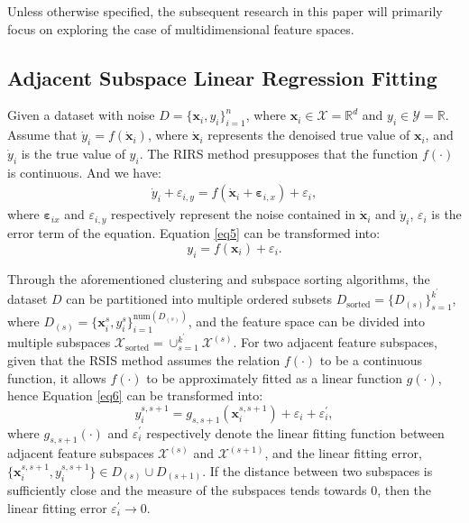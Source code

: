 \documentclass[final,3p,times]{elsarticle}
\begin{document}
Unless otherwise specified, the subsequent research in this paper 
will primarily focus on exploring the case of multidimensional 
feature spaces.

\subsection{Adjacent Subspace Linear Regression Fitting}
Given a dataset with noise $D=\{\boldsymbol{x}_i,y_i\}_{i=1}^n$, 
where $\boldsymbol{x}_i\in \mathcal{X}=\mathbb{R}^d$ and 
$y_i\in\mathcal{Y}=\mathbb{R}$. Assume that 
$\dot{y}_i=f(\dot{\boldsymbol{x}}_i)$, where 
$\dot{\boldsymbol{x}}_i$ represents the denoised true value of 
$\boldsymbol{x}_i$, and $\dot{y}_i$ is the true value of 
$y_i$. The RIRS method presupposes that the function $f(\cdot)$ 
is continuous. And we have:
\begin{align} 
\label{eq5}
\dot{y}_i+\varepsilon_{i,y}=f(\dot{\boldsymbol{x}}_i+
\boldsymbol{\varepsilon}_{i,x})+\varepsilon_i, 
\end{align}
where $\boldsymbol{\varepsilon}_{ix}$ and $\varepsilon_{i,y}$ 
respectively represent the noise contained in 
$\dot{\boldsymbol{x}}_i$ and $\dot{y}_i$, $\varepsilon_i$ is the 
error term of the equation. Equation \eqref{eq5} can be transformed into:
\begin{equation} 
\label{eq6}
y_i=f(\boldsymbol{x}_i)+\varepsilon_i. 
\end{equation}

Through the aforementioned clustering and subspace sorting 
algorithms, the dataset $D$ can be partitioned into multiple 
ordered subsets $D_{\text{sorted}}=\{D_{(s)}\}_{s=1}^{k^\prime}$, 
where $D_{(s)}=\{ \boldsymbol{x}_i^s,y_i^s \}_{i=1}^{\text{num}
(D_{(s)})}$, and the feature space can be divided into multiple 
subspaces $\mathcal{X}_{\text{sorted}}=\cup_{s=1}^{k^\prime}\mathcal{X}^{(s)}$. For 
two adjacent feature subspaces, given that the RSIS method assumes 
the relation $f(\cdot)$ to be a continuous function, it allows 
$f(\cdot)$ to be approximately fitted as a linear function 
$g(\cdot)$, hence Equation \eqref{eq6} can be transformed into: 
\begin{equation} 
\label{eq7}
y_i^{s,s+1}=g_{s,s+1}(\boldsymbol{x}_i^{s,s+1})+\varepsilon_i+
\varepsilon_i^\prime, 
\end{equation}
where $g_{s,s+1}(\cdot)$ and $\varepsilon_i^\prime$ respectively 
denote the linear fitting function between adjacent feature 
subspaces $\mathcal{X}^{(s)}$ and $\mathcal{X}^{(s+1)}$, and the linear 
fitting error, $\{\boldsymbol{x}_i^{s,s+1},y_i^{s,s+1}\}\in D_{(s)}\cup 
D_{(s+1)}$. If the distance between two subspaces is sufficiently 
close and the measure of the subspaces tends towards $0$, then the 
linear fitting error $\varepsilon_i^\prime\rightarrow0$.
\end{document}
